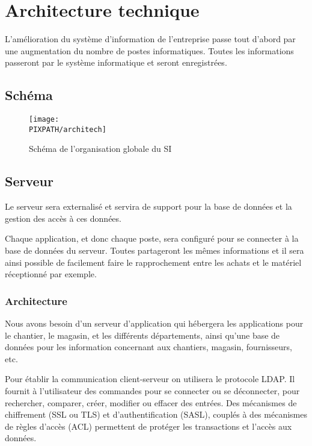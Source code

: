 \section{Architecture technique}
L'amélioration du système d’information de l'entreprise passe tout d'abord
par une augmentation du nombre de postes informatiques. Toutes les
informations passeront par le système informatique et seront enregistrées.

\subsection{Schéma}

\begin{figure}[!h]
\begin{center}
\texttt{[image: \\PIXPATH/architech]}
\caption{Schéma de l'organisation globale du SI}
\end{center}
\end{figure}


\subsection{Serveur}

Le serveur sera externalisé et servira de support pour la base de
données et la gestion des accès à ces données. 

Chaque application, et donc chaque poste, sera configuré pour se connecter
à la base de données du serveur.  Toutes partageront les mêmes informations
et il sera ainsi possible de facilement faire le rapprochement entre les
achats et le matériel réceptionné par exemple.

	\subsubsection{Architecture}
Nous avons besoin d'un serveur d'application qui hébergera les applications
pour le chantier, le magasin, et les différents départements,  ainsi qu'une
base de données pour les information concernant aux chantiers, magasin,
fournisseurs, etc. 

Pour établir la communication client-serveur on utilisera le protocole
LDAP. Il fournit à l'utilisateur des commandes pour se connecter ou se
déconnecter,  pour rechercher, comparer, créer, modifier ou effacer des
entrées.  Des mécanismes de chiffrement (SSL ou TLS) et d'authentification
(SASL), couplés à des mécanismes de règles d'accès (ACL) permettent de
protéger les transactions et l'accès aux données.

